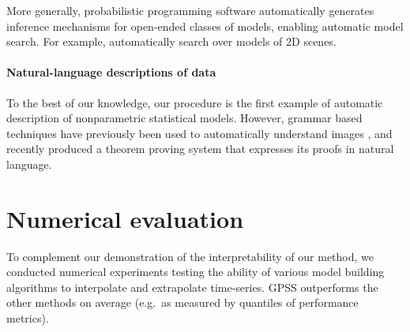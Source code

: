 \documentclass{article}
\def\eg{e.g.\ }
\begin{document}
More generally, probabilistic programming \cite{goodman2008church} software automatically generates inference mechanisms for open-ended classes of models, enabling automatic model search.
For example, \citet{VikashScene13} automatically search over models of 2D scenes.



\paragraph{Natural-language descriptions of data}

To the best of our knowledge, our procedure is the first example of automatic description of nonparametric statistical models.
However, grammar based techniques have previously been used to automatically understand images \cite{zhu2007stochastic}, and recently \citet{GanesalingamG13} produced a theorem proving system that expresses its proofs in natural language.








\section{Numerical evaluation}
\label{sec:numerical}

To complement our demonstration of the interpretability of our method, we conducted numerical experiments testing the ability of various model building algorithms to interpolate and extrapolate time-series.
GPSS outperforms the other methods on average (\eg as measured by quantiles of performance metrics).
\end{document}
